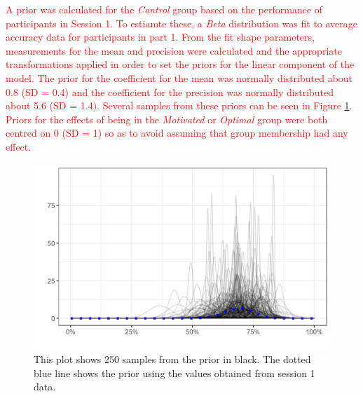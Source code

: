 \documentclass[vision,article,submit,moreauthors,pdftex,10pt,a4paper]{mdpi}
\begin{document}
\textcolor{red}{A prior was calculated for the \textit{Control} group based on the performance of participants in Session 1. To estiamte these, a \textit{Beta} distribution was fit to average accuracy data for participants in part 1. From the fit shape parameters, measurements for the mean and precision were calculated and the appropriate transformations applied in order to set the priors for the linear component of the model. The prior for the coefficient for the mean was normally distributed about 0.8 (SD = 0.4) and the coefficient for the precision was normally distributed about 5.6 (SD = 1.4). Several samples from these priors can be seen in Figure \ref{fig:Priors}. Priors for the effects of being in the \textit{Motivated} or \textit{Optimal} group were both centred on 0 (SD = 1) so as to avoid assuming that group membership had any effect.}


\begin{figure}[H]
	\centering
	\includegraphics[width=12cm]{../Figures/priors_plt_estfromdata.png}
	\caption{This plot shows 250 samples from the prior in black. The dotted blue line shows the prior using the values obtained from session 1 data.}
	\label{fig:Priors}
\end{figure} 

\end{document}

